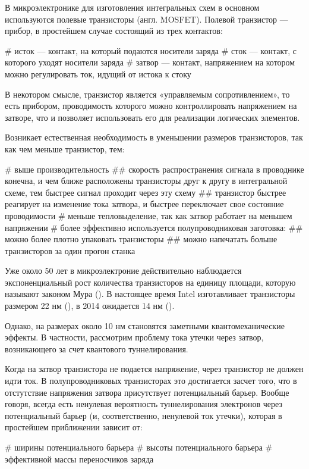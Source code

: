 \startprefacepage

В микроэлектронике для изготовления интегральных схем в основном используются полевые транзисторы (англ. MOSFET). Полевой транзистор — прибор, в простейшем случае состоящий из трех контактов:
\begin{easylist}[itemize]
# исток — контакт, на который подаются носители заряда
# сток — контакт, с которого уходят носители заряда
# затвор — контакт, напряжением на котором можно регулировать ток, идущий от истока к стоку
\end{easylist}
В некотором смысле, транзистор является «управляемым сопротивлением», то есть прибором, проводимость которого можно контроллировать напряжением на затворе, что и позволяет использовать его для реализации логических элементов.

Возникает естественная необходимость в уменьшении размеров транзисторов, так как чем меньше транзистор, тем:
\begin{easylist}[itemize]
# выше производительность
## скорость распространения сигнала в проводнике конечна, и чем ближе расположены транзисторы друг к другу в интегральной схеме, тем быстрее сигнал проходит через эту схему
## транзистор быстрее реагирует на изменение тока затвора, и быстрее переключает свое состояние проводимости
# меньше тепловыделение, так как затвор работает на меньшем напряжении
# более эффективно используется полупроводниковая заготовка:
## можно более плотно упаковать транзисторы
## можно напечатать больше транзисторов за один прогон станка
\end{easylist}

Уже около 50 лет в микроэлектроние действительно наблюдается экспоненциальный рост количества транзисторов на единицу площади, которую называют законом Мура (). В настоящее время Intel изготавливает транзисторы размером 22 нм (), в 2014 ожидается 14 нм ().



Однако, на размерах около 10 нм становятся заметными квантомеханические эффекты. В частности, рассмотрим проблему тока утечки через затвор, возникающего за счет квантового туннелирования.

Когда на затвор транзистора не подается напряжение, через транзистор не должен идти ток. В полупроводниковых транзисторах это достигается засчет того, что в отстутствие напряжения затвора присутствует потенциальный барьер. Вообще говоря, всегда есть ненулевая вероятность туннелирования электронов через потенциальный барьер (и, соответственно, ненулевой ток утечки), которая в простейшем приближении  зависит от:
\begin{easylist}[itemize]
# ширины потенциального барьера
# высоты потенциального барьера
# эффективной массы переносчиков заряда %
\end{easylist}

